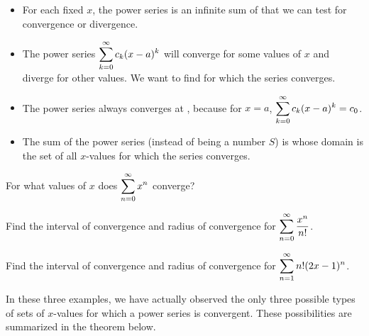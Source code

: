 \documentclass[12pt]{article}
\begin{document}
\begin{itemize}
\item For each fixed $x$, the power series is an infinite sum of \underline{\hspace{40mm}} that we can test for convergence or divergence.
\item The power series $\displaystyle\sum_{k=0}^\infty c_k(x-a)^k$ will converge for some values of $x$ and diverge for other values. We want to find \underline{\hspace{54mm}} for which the series converges.
\item The power series always converges at \underline{\hspace{50mm}}, because for $x=a$, $\displaystyle\sum_{k=0}^\infty c_k(x-a)^k=c_0$.
\item The sum of the power series (instead of being a number $S$) is \underline{\hspace{40mm}} whose domain is the set of all $x$-values for which the series converges.
\end{itemize}

\newpage


\vspace{5mm}


\vspace{5mm}

\Example For what values of $x$ does $\displaystyle\sum_{n=0}^\infty x^n$ converge?

\vfill

\Example Find the interval of convergence and radius of convergence for $\displaystyle\sum_{n=0}^\infty \dfrac{x^n}{n!}$.

\vfill

\newpage

\Example Find the interval of convergence and radius of convergence for $\displaystyle\sum_{n=1}^\infty n!(2x-1)^n$.

\vfill

In these three examples, we have actually observed the only three possible types of sets of $x$-values for which a power series is convergent. These possibilities are summarized in the theorem below.

\vspace{5mm}
\end{document}
